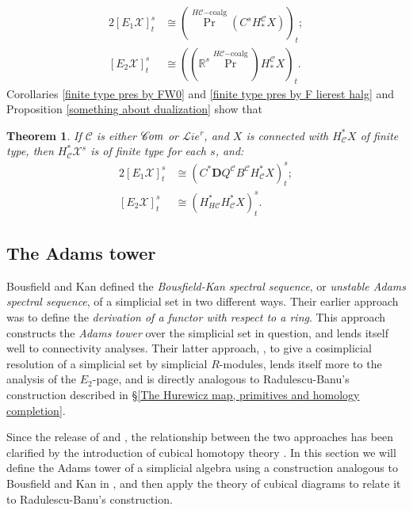 \documentclass[11pt]{amsart} \renewcommand{\baselinestretch}{1.2}
\theoremstyle{plain}
\newtheorem{thm}{Theorem}[section] %
\numberwithin{equation}{section} %
\theoremstyle{plain}
\newtheorem{thm}{Theorem}[chapter] %
\numberwithin{equation}{chapter} %
\DeclareMathOperator{\Prim}{Pr}
\newcommand{\scrL}{\mathscr{L}}
\newcommand{\scrC}{\mathscr{C}}
\newcommand{\calx}{\mathcal{X}}
\newcommand{\calc}{\mathcal{C}}
\newcommand{\HA}[1]{H#1}
\newcommand{\HC}[1]{H#1\mathrm{-coalg}}
\newcommand{\algs}{{\scrC\!\textit{\normalfont\textit{om}}}}
\newcommand{\restliealgs}{{\scrL\!\textit{ie}^\textit{r}}}
\newcommand{\algcat}{{\calc}}%
\newcommand{\Edownup}[5]{[E_{#1}^{#2}#3]^{#4}_{#5}}
\newcommand{\dual}{\mathbf{D}}
\newcommand{\SubsectionOrSection}[1]{\subsection{#1}}
\begin{document}
\begin{Bousfield-Kan spectral sequence}
\begin{alignat*}{2}
\Edownup{1}{}{\calx}{s}{t}&\cong (\Prim^{\HC{\calc}}(C^sH_*^{\algcat}X))_{t};\\
\Edownup{2}{}{\calx}{s}{t}&\cong((\mathbb{R}^s\Prim^{\HC{\calc}})H_*^{\algcat}X)_t.
\end{alignat*}
Corollaries \ref{finite type pres by FW0} and \ref{finite type pres by F lierest halg} and Proposition \ref{something about dualization} show that
\begin{thm}
\label{identify E2 with derived Q}
If $\algcat$ is either $\algs$ or $\restliealgs$, and $X$ is connected with $H^*_\calc X$  of finite type, then $H^*_\calc\calx^s$ is of finite type for each $s$, and:
\begin{alignat*}{2}
\Edownup{1}{}{\calx}{s}{t}&\cong (C^*\dual Q^\algcat B^\algcat H^*_{\algcat}X)^{s}_{t};\\
\Edownup{2}{}{\calx}{s}{t}&\cong (H^*_{\HA{\algcat}}H^*_{\algcat}X)^{s}_{t}.
\end{alignat*}
\end{thm}





\SubsectionOrSection{The Adams tower}\label{sec:derWRTab}\label{sec:relnWithRB}
Bousfield and Kan defined the \emph{Bousfield-Kan spectral sequence}, or \emph{unstable Adams spectral sequence}, of a simplicial set in two different ways. Their earlier approach \cite{BK_pairings.pdf} was to define the \emph{derivation of a functor with respect to a ring}. This approach constructs the \emph{Adams tower} over the simplicial set in question, and lends itself well to connectivity analyses. Their latter approach, \cite{BousKanSSeq.pdf}, to give a cosimplicial resolution of a simplicial set by simplicial $R$-modules, lends itself more to the analysis of the $E_2$-page, and is directly analogous to Radulescu-Banu's construction described in \S\ref{The Hurewicz map, primitives and homology completion}.

Since the release of \cite{BK_pairings.pdf} and \cite{BousKanSSeq.pdf}, the relationship between the two approaches has been clarified by the introduction of cubical homotopy theory \cite{GoodwillieCalcII}. In this section we will define the Adams tower of a simplicial algebra using a construction analogous to Bousfield and Kan in \cite{BK_pairings.pdf}, and then apply the theory of cubical diagrams to relate it to Radulescu-Banu's construction. 



\end{Bousfield-Kan spectral sequence}
\end{document}
